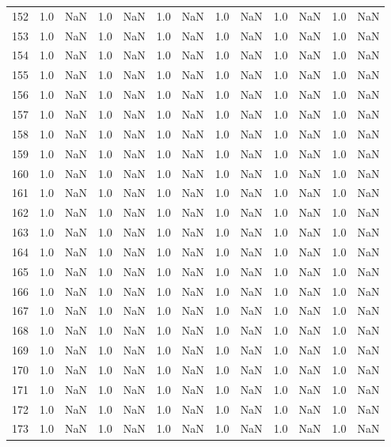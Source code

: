 \begin{tabular}{lrrrrrrrrrrrr}
152 & 1.0 & NaN & 1.0 & NaN & 1.0 & NaN & 1.0 & NaN & 1.0 & NaN & 1.0 & NaN \\
153 & 1.0 & NaN & 1.0 & NaN & 1.0 & NaN & 1.0 & NaN & 1.0 & NaN & 1.0 & NaN \\
154 & 1.0 & NaN & 1.0 & NaN & 1.0 & NaN & 1.0 & NaN & 1.0 & NaN & 1.0 & NaN \\
155 & 1.0 & NaN & 1.0 & NaN & 1.0 & NaN & 1.0 & NaN & 1.0 & NaN & 1.0 & NaN \\
156 & 1.0 & NaN & 1.0 & NaN & 1.0 & NaN & 1.0 & NaN & 1.0 & NaN & 1.0 & NaN \\
157 & 1.0 & NaN & 1.0 & NaN & 1.0 & NaN & 1.0 & NaN & 1.0 & NaN & 1.0 & NaN \\
158 & 1.0 & NaN & 1.0 & NaN & 1.0 & NaN & 1.0 & NaN & 1.0 & NaN & 1.0 & NaN \\
159 & 1.0 & NaN & 1.0 & NaN & 1.0 & NaN & 1.0 & NaN & 1.0 & NaN & 1.0 & NaN \\
160 & 1.0 & NaN & 1.0 & NaN & 1.0 & NaN & 1.0 & NaN & 1.0 & NaN & 1.0 & NaN \\
161 & 1.0 & NaN & 1.0 & NaN & 1.0 & NaN & 1.0 & NaN & 1.0 & NaN & 1.0 & NaN \\
162 & 1.0 & NaN & 1.0 & NaN & 1.0 & NaN & 1.0 & NaN & 1.0 & NaN & 1.0 & NaN \\
163 & 1.0 & NaN & 1.0 & NaN & 1.0 & NaN & 1.0 & NaN & 1.0 & NaN & 1.0 & NaN \\
164 & 1.0 & NaN & 1.0 & NaN & 1.0 & NaN & 1.0 & NaN & 1.0 & NaN & 1.0 & NaN \\
165 & 1.0 & NaN & 1.0 & NaN & 1.0 & NaN & 1.0 & NaN & 1.0 & NaN & 1.0 & NaN \\
166 & 1.0 & NaN & 1.0 & NaN & 1.0 & NaN & 1.0 & NaN & 1.0 & NaN & 1.0 & NaN \\
167 & 1.0 & NaN & 1.0 & NaN & 1.0 & NaN & 1.0 & NaN & 1.0 & NaN & 1.0 & NaN \\
168 & 1.0 & NaN & 1.0 & NaN & 1.0 & NaN & 1.0 & NaN & 1.0 & NaN & 1.0 & NaN \\
169 & 1.0 & NaN & 1.0 & NaN & 1.0 & NaN & 1.0 & NaN & 1.0 & NaN & 1.0 & NaN \\
170 & 1.0 & NaN & 1.0 & NaN & 1.0 & NaN & 1.0 & NaN & 1.0 & NaN & 1.0 & NaN \\
171 & 1.0 & NaN & 1.0 & NaN & 1.0 & NaN & 1.0 & NaN & 1.0 & NaN & 1.0 & NaN \\
172 & 1.0 & NaN & 1.0 & NaN & 1.0 & NaN & 1.0 & NaN & 1.0 & NaN & 1.0 & NaN \\
173 & 1.0 & NaN & 1.0 & NaN & 1.0 & NaN & 1.0 & NaN & 1.0 & NaN & 1.0 & NaN \\

\end{tabular}
